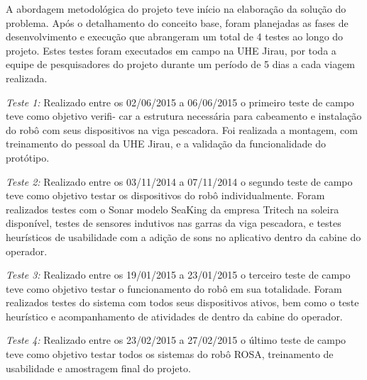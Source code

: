 A abordagem metodológica do projeto teve início na elaboração da solução do problema. Após o
detalhamento do conceito base, foram planejadas as fases de desenvolvimento e execução que
abrangeram um total de 4 testes ao longo do projeto. Estes testes foram executados em campo na
UHE Jirau, por toda a equipe de pesquisadores do projeto durante um período de 5
dias a cada viagem realizada.

\emph{Teste 1:}
Realizado entre os 02/06/2015 a 06/06/2015 o primeiro teste de campo teve como objetivo verifi-
car a estrutura necessária para cabeamento e instalação do robô com seus dispositivos na viga
pescadora. Foi realizada a montagem, com treinamento do pessoal da UHE Jirau, e
a validação da funcionalidade do protótipo.

\emph{Teste 2:}
Realizado entre os 03/11/2014 a 07/11/2014 o segundo teste de campo teve como objetivo testar
os dispositivos do robô individualmente. Foram realizados testes com o Sonar
modelo SeaKing da empresa Tritech na soleira disponível, testes de sensores
indutivos nas garras da viga pescadora, e testes heurísticos de usabilidade
com a adição de sons no aplicativo dentro da cabine do operador.

\emph{Teste 3:}
Realizado entre os 19/01/2015 a 23/01/2015 o terceiro teste de campo teve como objetivo testar
o funcionamento do robô em sua totalidade. Foram realizados testes do sistema com todos seus
dispositivos ativos, bem como o teste heurístico e acompanhamento de atividades de dentro da
cabine do operador.

\emph{Teste 4:}
Realizado entre os 23/02/2015 a 27/02/2015 o último teste de campo teve como objetivo testar
todos os sistemas do robô ROSA, treinamento de usabilidade e amostragem final do projeto.